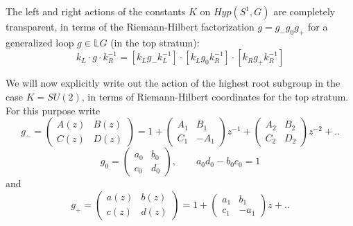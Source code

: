 \documentclass{amsart}
\theoremstyle{conjecture}
\theoremstyle{definition}
\theoremstyle{question}
\theoremstyle{questions}
\theoremstyle{remark}
\theoremstyle{remarks}
\theoremstyle{example}
\numberwithin{equation}{section}
\begin{document}
The left and right actions of the constants $K$ on $Hyp(S^1,G)$
are completely transparent, in terms of the Riemann-Hilbert
factorization $g=g_{-}g_0g_{+}$ for a generalized loop $g\in \mathbb L G$ (in the top stratum):
$$k_L\cdot g\cdot k_R^{-1}=[k_Lg_{-}k_L^{-1}]\cdot [k_Lg_0k_R^{-1}]\cdot [k_
Rg_{+}k_R^{-1}]$$

We will now explicitly write out the action of the highest root subgroup in the case $K=SU(2)$, in terms of Riemann-Hilbert coordinates
for the top stratum. For
this purpose write
$$g_{-}=\left(\begin{matrix} A(z)&B(z)\\
C(z)&D(z)\end{matrix} \right)=1+\left(\begin{matrix} A_1&B_1\\
C_1&-A_1\end{matrix} \right)z^{-1}+\left(\begin{matrix} A_2&B_2\\
C_2&D_2\end{matrix} \right)z^{-2}+..$$
$$g_0=\left(\begin{matrix}a_0&b_0\\c_0&d_0\end{matrix}\right), \qquad a_0d_0-b_0c_0=1$$
and
$$g_{+}=\left(\begin{matrix} a(z)&b(z)\\
c(z)&d(z)\end{matrix} \right)=1+\left(\begin{matrix} a_1&b_1\\
c_1&-a_1\end{matrix} \right)z+..$$
\end{document}
